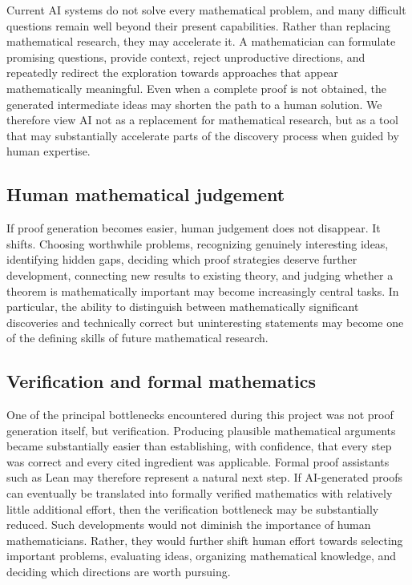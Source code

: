 \documentclass[11pt,reqno]{amsart}
\theoremstyle{plain}
\theoremstyle{definition}
\begin{document}
Current AI systems do not solve every mathematical problem, and many difficult questions remain well beyond their present capabilities. Rather than replacing mathematical research, they may accelerate it. A mathematician can formulate promising questions, provide context, reject unproductive directions, and repeatedly redirect the exploration towards approaches that appear mathematically meaningful. Even when a complete proof is not obtained, the generated intermediate ideas may shorten the path to a human solution. We therefore view AI not as a replacement for mathematical research, but as a tool that may substantially accelerate parts of the discovery process when guided by human expertise.

\subsection{Human mathematical judgement}

If proof generation becomes easier, human judgement does not disappear. It shifts. Choosing worthwhile problems, recognizing genuinely interesting ideas, identifying hidden gaps, deciding which proof strategies deserve further development, connecting new results to existing theory, and judging whether a theorem is mathematically important may become increasingly central tasks. In particular, the ability to distinguish between mathematically significant discoveries and technically correct but uninteresting statements may become one of the defining skills of future mathematical research.

\subsection{Verification and formal mathematics}

One of the principal bottlenecks encountered during this project was not proof generation itself, but verification. Producing plausible mathematical arguments became substantially easier than establishing, with confidence, that every step was correct and every cited ingredient was applicable. Formal proof assistants such as Lean may therefore represent a natural next step. If AI-generated proofs can eventually be translated into formally verified mathematics with relatively little additional effort, then the verification bottleneck may be substantially reduced. Such developments would not diminish the importance of human mathematicians. Rather, they would further shift human effort towards selecting important problems, evaluating ideas, organizing mathematical knowledge, and deciding which directions are worth pursuing.
\end{document}

